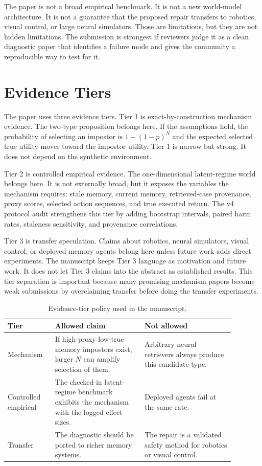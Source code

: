 \documentclass{article}
\begin{document}
The paper is not a broad empirical benchmark. It is not a new world-model
architecture. It is not a guarantee that the proposed repair transfers to
robotics, visual control, or large neural simulators. Those are limitations,
but they are not hidden limitations. The submission is strongest if reviewers
judge it as a clean diagnostic paper that identifies a failure mode and gives
the community a reproducible way to test for it.

\section{Evidence Tiers}
\label{app:evidence-tiers}

The paper uses three evidence tiers. Tier 1 is exact-by-construction mechanism
evidence. The two-type proposition belongs here. If the assumptions hold, the
probability of selecting an impostor is $1-(1-p)^N$ and the expected selected
true utility moves toward the impostor utility. Tier 1 is narrow but strong.
It does not depend on the synthetic environment.

Tier 2 is controlled empirical evidence. The one-dimensional latent-regime
world belongs here. It is not externally broad, but it exposes the variables
the mechanism requires: stale memory, current memory, retrieved-case
provenance, proxy scores, selected action sequences, and true executed return.
The v4 protocol audit strengthens this tier by adding bootstrap intervals, paired harm
rates, staleness sensitivity, and provenance correlations.

Tier 3 is transfer speculation. Claims about robotics, neural simulators,
visual control, or deployed memory agents belong here unless future work adds
direct experiments. The manuscript keeps Tier 3 language as motivation and
future work. It does not let Tier 3 claims into the abstract as established
results. This tier separation is important because many promising mechanism
papers become weak submissions by overclaiming transfer before doing the
transfer experiments.

\begin{table}[t]
\centering
\small
\caption{Evidence-tier policy used in the manuscript.}
\label{tab:evidence-tiers}
\begin{tabular}{p{0.18\linewidth}p{0.35\linewidth}p{0.35\linewidth}}
\toprule
Tier & Allowed claim & Not allowed \\
\midrule
Mechanism & If high-proxy low-true memory impostors exist, larger $N$ can
amplify selection of them. & Arbitrary neural retrievers always produce this
candidate type. \\
Controlled empirical & The checked-in latent-regime benchmark exhibits the
mechanism with the logged effect sizes. & Deployed agents fail at the same
rate. \\
Transfer & The diagnostic should be ported to richer memory systems. & The
repair is a validated safety method for robotics or visual control. \\
\bottomrule
\end{tabular}
\end{table}
\end{document}
